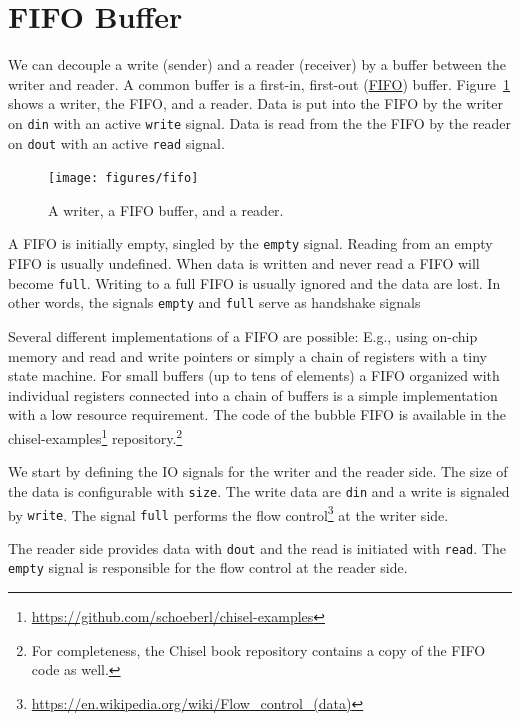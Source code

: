\documentclass[%
    10pt,
    headinclude, footexclude,
    openright, %
    notitlepage,
    cleardoubleempty,
    headsepline,
    pointlessnumbers,
    bibtotoc, idxtotoc,
    ]{scrbook}
\newcommand{\code}[1]{{\small{\texttt{#1}}}}
\newcommand{\myref}[2]{\href{#1}{#2}}
\renewcommand{\myref}[2]{{#2}{\footnote{\url{#1}}}}
\begin{document}
\section{FIFO Buffer}
\label{sec:fifo}



We can decouple a write (sender) and a reader (receiver) by a buffer
between the writer and reader.
A common buffer is a first-in, first-out
(\href{https://en.wikipedia.org/wiki/FIFO_%28computing_and_electronics%29}{FIFO})
buffer. Figure~\ref{fig:fifo} shows a writer, the FIFO, and a reader.
Data is put into the FIFO by the writer on \code{din} with an active
\code{write} signal. Data is read from the the FIFO by the reader on
\code{dout} with an active \code{read} signal.

\begin{figure}
  \centering
  \texttt{[image: figures/fifo]}
  \caption{A writer, a FIFO buffer, and a reader.}
  \label{fig:fifo}
\end{figure}

A FIFO is initially empty, singled by the \code{empty} signal. Reading
from an empty FIFO is usually undefined. When data is written and never
read a FIFO will become \code{full}. Writing to a full FIFO is usually ignored
and the data are lost. In other words, the signals \code{empty} and \code{full}
serve as handshake signals 

Several different implementations of a FIFO are possible: E.g., using on-chip
memory and read and write pointers or simply a chain of registers with a
tiny state machine. For small buffers (up to tens of elements) a FIFO organized
with individual registers connected into a chain of buffers is a simple
implementation with a low resource requirement.
The code of the bubble FIFO is available in the
\myref{https://github.com/schoeberl/chisel-examples}{chisel-examples}
repository.\footnote{For completeness, the Chisel book repository contains
a copy of the FIFO code as well.}

We start by defining the IO signals for the writer and the reader side.
The size of the data is configurable with \code{size}.
The write data are \code{din} and a write is signaled by \code{write}.
The signal \code{full} performs the
\myref{https://en.wikipedia.org/wiki/Flow_control_(data)}{flow control}
at the writer side.


The reader side provides data with \code{dout} and the read is initiated
with \code{read}. The \code{empty} signal is responsible for the flow control
at the reader side.
\end{document}
